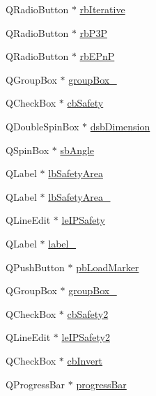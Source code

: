 \begin{DoxyCompactItemize}
\item 
Q\+Radio\+Button $\ast$ \hyperlink{class_ui___rigid_track_class_a7ee2c6448b82ecb455b4f6122ea8dbeb}{rb\+Iterative}
\item 
Q\+Radio\+Button $\ast$ \hyperlink{class_ui___rigid_track_class_a3f20a41a0b0d35ff5a077530743c82c9}{rb\+P3P}
\item 
Q\+Radio\+Button $\ast$ \hyperlink{class_ui___rigid_track_class_a1c45060b8c85c0e4cfe4a7c1e40f203a}{rb\+E\+PnP}
\item 
Q\+Group\+Box $\ast$ \hyperlink{class_ui___rigid_track_class_a85d7c172656cb175131c5da83caf6a48}{group\+Box\+\_}
\item 
Q\+Check\+Box $\ast$ \hyperlink{class_ui___rigid_track_class_a44e812df547a219bdf2b43383a4e849b}{cb\+Safety}
\item 
Q\+Double\+Spin\+Box $\ast$ \hyperlink{class_ui___rigid_track_class_a20f78b58534d29da3d836c2af79a6232}{dsb\+Dimension}
\item 
Q\+Spin\+Box $\ast$ \hyperlink{class_ui___rigid_track_class_ac232f3d19d53b00aa61431725cbf71c4}{sb\+Angle}
\item 
Q\+Label $\ast$ \hyperlink{class_ui___rigid_track_class_a0996dad75e113e08fcaee07e55ceaca6}{lb\+Safety\+Area}
\item 
Q\+Label $\ast$ \hyperlink{class_ui___rigid_track_class_ace9b8966d2c9a38ef4bd4ba17db70c5a}{lb\+Safety\+Area\+\_}
\item 
Q\+Line\+Edit $\ast$ \hyperlink{class_ui___rigid_track_class_af722611603b357175b3ce505bdf468b1}{le\+I\+P\+Safety}
\item 
Q\+Label $\ast$ \hyperlink{class_ui___rigid_track_class_a40dc760bee515c66ebe81f67b2d7f5f9}{label\+\_}
\item 
Q\+Push\+Button $\ast$ \hyperlink{class_ui___rigid_track_class_a76c00d83ae38b7eaa03ef28c280631fa}{pb\+Load\+Marker}
\item 
Q\+Group\+Box $\ast$ \hyperlink{class_ui___rigid_track_class_a822d802011c4868603863fa70f5589ae}{group\+Box\+\_}
\item 
Q\+Check\+Box $\ast$ \hyperlink{class_ui___rigid_track_class_a1e5273e53cb1276c8c056f1da4e72910}{cb\+Safety2}
\item 
Q\+Line\+Edit $\ast$ \hyperlink{class_ui___rigid_track_class_a70522f29594cbdc654ffed858b3e1fc5}{le\+I\+P\+Safety2}
\item 
Q\+Check\+Box $\ast$ \hyperlink{class_ui___rigid_track_class_a370014fb6d177a07220b69155b4c101b}{cb\+Invert}
\item 
Q\+Progress\+Bar $\ast$ \hyperlink{class_ui___rigid_track_class_a4f53c207d82dc9555709f1ace400d89b}{progress\+Bar}

\end{DoxyCompactItemize}

